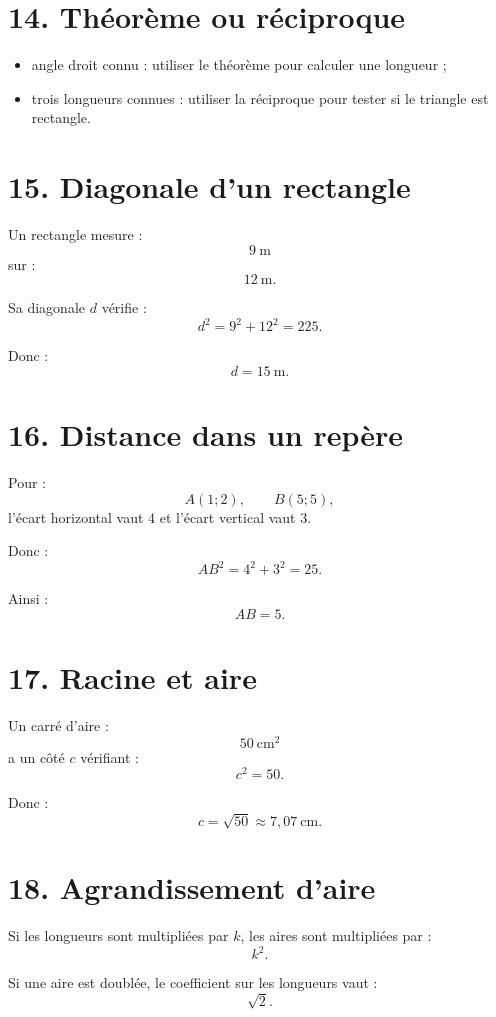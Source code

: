 \section{14. Théorème ou réciproque}

\begin{methode}
\begin{itemize}
\item angle droit connu : utiliser le théorème pour calculer une longueur ;
\item trois longueurs connues : utiliser la réciproque pour tester si le triangle est rectangle.
\end{itemize}
\end{methode}

\section{15. Diagonale d'un rectangle}

Un rectangle mesure :
\[
9\ \text{m}
\]
sur :
\[
12\ \text{m}.
\]

Sa diagonale $d$ vérifie :
\[
d^2=9^2+12^2=225.
\]

Donc :
\[
\boxed{d=15\ \text{m}}.
\]

\section{16. Distance dans un repère}

Pour :
\[
A(1;2),\qquad B(5;5),
\]
l'écart horizontal vaut $4$ et l'écart vertical vaut $3$.

Donc :
\[
AB^2=4^2+3^2=25.
\]

Ainsi :
\[
\boxed{AB=5}.
\]

\section{17. Racine et aire}

Un carré d'aire :
\[
50\ \text{cm}^2
\]
a un côté $c$ vérifiant :
\[
c^2=50.
\]

Donc :
\[
c=\sqrt{50}\approx7{,}07\ \text{cm}.
\]

\section{18. Agrandissement d'aire}

Si les longueurs sont multipliées par $k$, les aires sont multipliées par :
\[
k^2.
\]

Si une aire est doublée, le coefficient sur les longueurs vaut :
\[
\sqrt2.
\]

